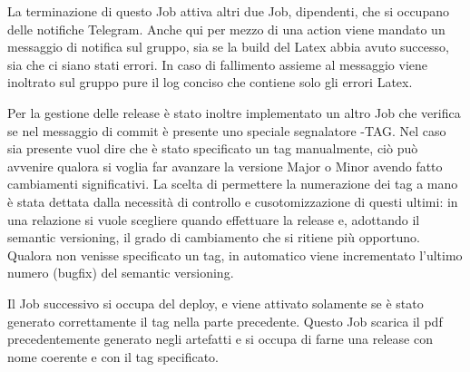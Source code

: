        La terminazione di questo Job attiva altri due Job, dipendenti, che si occupano delle notifiche Telegram. Anche qui per mezzo di una action viene mandato un messaggio di notifica sul gruppo, sia se la build del Latex abbia avuto successo, sia che ci siano stati errori. In caso di fallimento assieme al messaggio viene inoltrato sul gruppo pure il log conciso che contiene solo gli errori Latex. 
        
        Per la gestione delle release è stato inoltre implementato un altro Job che verifica se nel messaggio di commit è presente uno speciale segnalatore -TAG{}. Nel caso sia presente vuol dire che è stato specificato un tag manualmente, ciò può avvenire qualora si voglia far avanzare la versione Major o Minor avendo fatto cambiamenti significativi.
        La scelta di permettere la numerazione dei tag a mano è stata dettata dalla necessità di controllo e cusotomizzazione di questi ultimi: in una relazione si vuole scegliere quando effettuare la release e, adottando il semantic versioning, il grado di cambiamento che si ritiene più opportuno.
        Qualora non venisse specificato un tag, in automatico viene incrementato l'ultimo numero (bugfix) del semantic versioning.
        
        Il Job successivo si occupa del deploy, e viene attivato solamente se è stato generato correttamente il tag nella parte precedente. Questo Job scarica il pdf precedentemente generato negli artefatti e si occupa di farne una release con nome coerente e con il tag specificato. 
        
